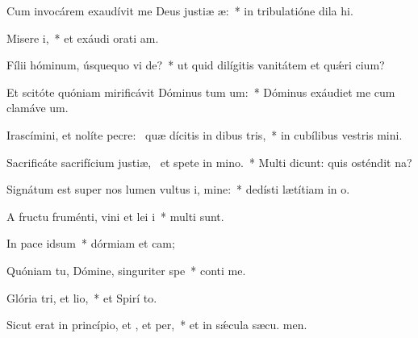 \item Cum invocárem exaudívit me Deus justiæ æ:~* in tribulatióne dila hi.
\item Misere i,~* et exáudi orati am.
\item Fílii hóminum, úsquequo vi de?~* ut quid dilígitis vanitátem et quǽri cium?
\item Et scitóte quóniam mirificávit Dóminus tum um:~* Dóminus exáudiet me cum clamáve  um.
\item Irascímini, et nolíte pecre:~\pscross{} quæ dícitis in dibus tris,~* in cubílibus vestris mini.
\item Sacrificáte sacrifícium justiæ,~\pscross{} et spete in mino.~* Multi dicunt: quis osténdit  na?
\item Signátum est super nos lumen vultus i, mine:~* dedísti lætítiam in  o.
\item A fructu fruménti, vini et lei i~* multi sunt.
\item In pace  idsum~* dórmiam et cam;
\item Quóniam tu, Dómine, singuriter  spe~* conti me.
\item Glória tri, et lio,~* et Spirí to.
\item Sicut erat in princípio, et , et per,~* et in sǽcula sæcu. men.
